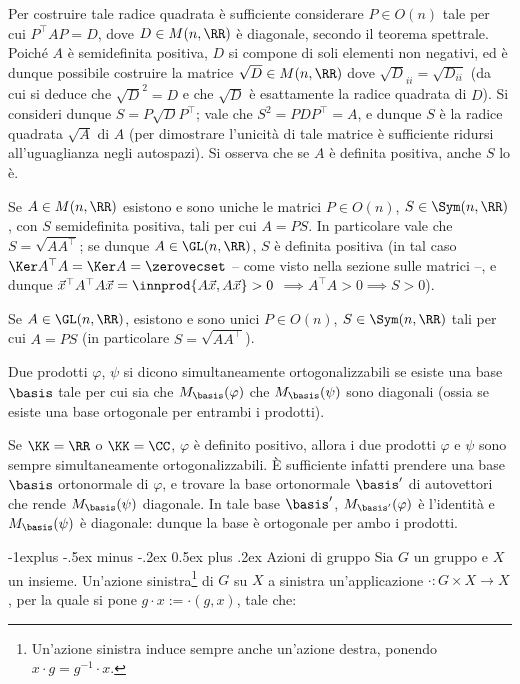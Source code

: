 \documentclass[10pt,landscape]{article}
\makeatletter
\renewcommand{\subsection}{\@startsection{subsection}{2}{0mm}%
	{-1explus -.5ex minus -.2ex}%
	{0.5ex plus .2ex}%
	{\normalfont\normalsize\bfseries}}
\makeatother
\begin{document}
\begin{multicols}{3}
		Per costruire tale radice quadrata è sufficiente
		considerare $P \in O(n)$ tale per cui
		$P^\top A P = D$, dove $D \in M(n, \RR)$ è
		diagonale, secondo il teorema spettrale. Poiché $A$ è semidefinita positiva, $D$
		si compone di soli elementi non negativi, ed è
		dunque possibile costruire la matrice $\sqrt{D} \in M(n, \RR)$ dove $\sqrt{D}_{ii} = \sqrt{D_{ii}}$ (da cui si deduce che $\sqrt{D}^2 = D$ e che $\sqrt{D}$ è esattamente la radice quadrata di $D$).
		Si consideri dunque $S = P \sqrt{D} P^\top$; vale
		che $S^2 = P D P^\top = A$, e dunque $S$ è la
		radice quadrata $\sqrt{A}$ di $A$ (per dimostrare l'unicità di tale matrice è sufficiente ridursi all'uguaglianza negli autospazi). Si osserva che
		se $A$ è definita positiva, anche $S$ lo è. \\ \vskip 0.05in
		
		Se $A \in M(n, \RR)$ esistono e sono uniche le
		matrici $P \in O(n)$, $S \in \Sym(n, \RR)$, con $S$ semidefinita positiva, tali per
		cui $A = PS$. In particolare vale che $S = \sqrt{A A^\top}$; se dunque $A \in \GL(n, \RR)$, $S$ è
		definita positiva (in tal caso $\Ker A^\top A = \Ker A = \zerovecset$ -- come visto nella sezione sulle matrici --, e dunque $\vec x^\top A^\top A \vec x = \innprod{A \vec x, A \vec x} > 0$ $\implies A^\top A > 0 \implies S > 0$).
		
		Se $A \in \GL(n, \RR)$, esistono e sono unici $P \in O(n)$,
		$S \in \Sym(n, \RR)$ tali per cui $A = PS$ (in particolare $S = \sqrt{A A^\top}$).
		
		Due prodotti $\varphi$, $\psi$ si dicono simultaneamente ortogonalizzabili se esiste una
		base $\basis$ tale per cui sia che $M_\basis(\varphi)$ che $M_\basis(\psi)$ sono
		diagonali (ossia se esiste una base ortogonale per
		entrambi i prodotti). \\ \vskip 0.05in

		Se $\KK=\RR$ o $\KK=\CC$, $\varphi$ è definito positivo, allora
		i due prodotti $\varphi$ e $\psi$ sono sempre simultaneamente ortogonalizzabili. È sufficiente infatti prendere
		una base $\basis$ ortonormale di $\varphi$, e trovare la base ortonormale $\basis'$ di autovettori
		che rende $M_\basis(\psi)$ diagonale. In tale base $\basis'$, $M_{\basis'}(\varphi)$
		è l'identità e $M_\basis(\psi)$ è diagonale: dunque la base è ortogonale per ambo
		i prodotti.
		
		\subsection{Azioni di gruppo}
		Sia $G$ un gruppo e $X$ un insieme. Un'azione sinistra\footnote{Un'azione sinistra induce sempre anche un'azione destra, ponendo $x \cdot g=g^{-1} \cdot x$.} di $G$ su $X$ a sinistra un'applicazione $\cdot : G \times X \rightarrow X$, per la quale si pone $g \cdot x := \cdot(g, x)$, tale che:


\end{multicols}
\end{document}

